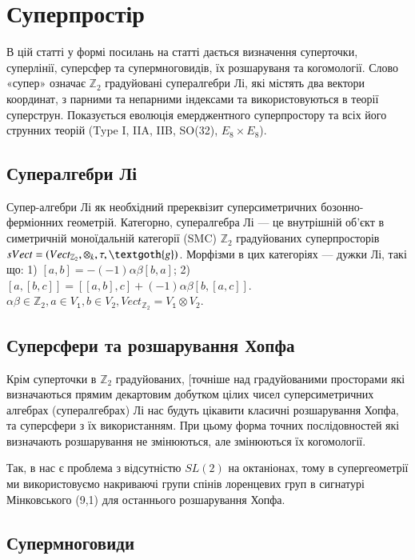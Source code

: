\section{Суперпростір}

В цій статті у формі посилань на статті дається визначення суперточки,
суперлінії, суперсфер та супермноговидів, їх розшаруваня та когомології.
Слово «супер» означає $\mathbb{Z}_2$ градуйовані супералгебри Лі, які містять два
вектори координат, з парними та непарними індексами та використовуються в теорії
суперструн. Показується еволюція емерджентного суперпростору та всіх його струнних
теорій (Type I, IIA, IIB, SO(32), $E_8\times E_8$).

\subsection*{Супералгебри Лі}

Супер-алгебри Лі як необхідний пререквізит суперсиметричних
бозонно-ферміонних геометрій. Категорно, супералгебра Лі --- це
внутрішній об'єкт в симетричній моноїдальній категорії (SMC) $\mathbb{Z}_2$
градуйованих суперпросторів $sVect = (Vect_{\mathbb{Z}_2},\otimes_k, \tau, \textgoth{g})$.
Морфізми в цих категоріях --- дужки Лі, такі що:
1) $[a,b] = -(-1)\alpha\beta[b,a]$;
2) $[a,[b,c]]=[[a,b],c]+(-1)\alpha\beta[b,[a,c]]$.
$\alpha\beta \in \mathbb{Z}_2, a \in V_𝟷, b \in V_2, Vect_{\mathbb{Z}_2}=V_𝟷\otimes V_2$.

\subsection*{Суперсфери та розшарування Хопфа}

Крім суперточки в $\mathbb{Z}_2$ градуйованих, [точніше над градуйованими
просторами які визначаються прямим декартовим добутком цілих чисел
суперсиметричних алгебрах (супералгебрах) Лі нас будуть цікавити
класичні розшарування Хопфа, та суперсфери з їх використанням.
При цьому форма точних послідовностей які визначають розшарування
не змінюються, але змінюються їх когомології.

Так, в нас є проблема з відсутністю $SL(2)$ на октаніонах,
тому в супергеометрії ми використовуємо накриваючі групи
спінів лоренцевих груп в сигнатурі Мінковського (9,1)
для останнього розшарування Хопфа.

\subsection*{Супермноговиди}

